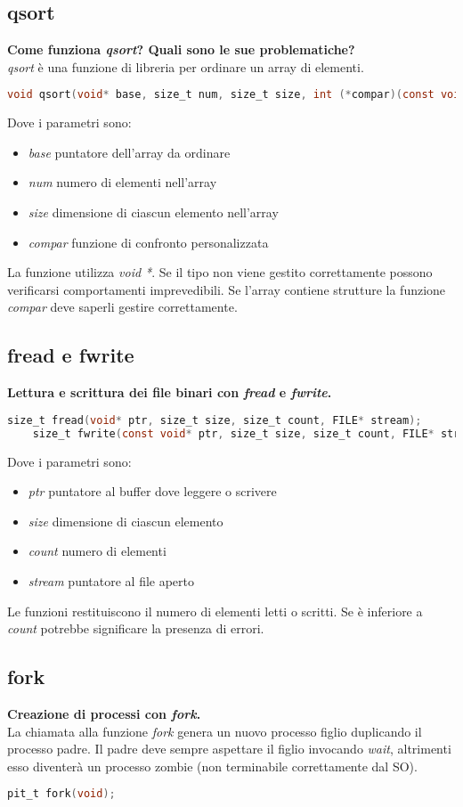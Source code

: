 \subsection{qsort}
\textbf{Come funziona \textit{qsort}? Quali sono le sue problematiche?}\\
\textit{qsort} è una funzione di libreria per ordinare un array di elementi.
\begin{lstlisting}[language=C]
	void qsort(void* base, size_t num, size_t size, int (*compar)(const void*, const void*));
\end{lstlisting}
Dove i parametri sono:
\begin{itemize}
	\item \textit{base} puntatore dell'array da ordinare
	\item \textit{num} numero di elementi nell'array
	\item \textit{size} dimensione di ciascun elemento nell'array
	\item \textit{compar} funzione di confronto personalizzata
\end{itemize}
La funzione utilizza \textit{void *}. Se il tipo non viene gestito correttamente possono verificarsi comportamenti imprevedibili. Se l'array contiene strutture la funzione \textit{compar} deve saperli gestire correttamente.
\subsection{fread e fwrite}
\textbf{Lettura e scrittura dei file binari con \textit{fread} e \textit{fwrite}.}\\
\begin{lstlisting}[language=C]
	size_t fread(void* ptr, size_t size, size_t count, FILE* stream);
	size_t fwrite(const void* ptr, size_t size, size_t count, FILE* stream);
\end{lstlisting}
Dove i parametri sono:
\begin{itemize}
	\item \textit{ptr} puntatore al buffer dove leggere o scrivere
	\item \textit{size} dimensione di ciascun elemento
	\item \textit{count} numero di elementi
	\item \textit{stream} puntatore al file aperto
\end{itemize}
Le funzioni restituiscono il numero di elementi letti o scritti. Se è inferiore a \textit{count} potrebbe significare la presenza di errori.
\subsection{fork}
\textbf{Creazione di processi con \textit{fork}.}\\
La chiamata alla funzione \textit{fork} genera un nuovo processo figlio duplicando il processo padre. Il padre deve sempre aspettare il figlio invocando \textit{wait}, altrimenti esso diventerà un processo zombie (non terminabile correttamente dal SO).
\begin{lstlisting}[language=C]
	pit_t fork(void);
\end{lstlisting}
